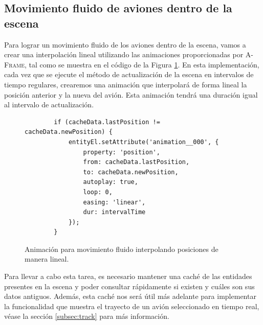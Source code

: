 \documentclass[a4paper, 11pt]{book}
\begin{document}
\subsection{Movimiento fluido de aviones dentro de la escena}
\label{subsec:movimientoFluido}
Para lograr un movimiento fluido de los aviones dentro de la escena, vamos a crear una interpolación lineal utilizando las animaciones proporcionadas por \textsc{A-Frame}, tal como se muestra en el código de la Figura \ref{codigo:movimientoFluido}. En esta implementación, cada vez que se ejecute el método de actualización de la escena en intervalos de tiempo regulares, crearemos una animación que interpolará de forma lineal la posición anterior y la nueva del avión. Esta animación tendrá una duración igual al intervalo de actualización.
\begin{figure}[h]
	\centering
	\begin{verbatim}
		if (cacheData.lastPosition != cacheData.newPosition) {
			entityEl.setAttribute('animation__000', {
				property: 'position',
				from: cacheData.lastPosition,
				to: cacheData.newPosition,
				autoplay: true,
				loop: 0,
				easing: 'linear',
				dur: intervalTime
			});
		}
	\end{verbatim}
	\caption{Animación para movimiento fluido interpolando posiciones de manera lineal.
		\label{codigo:movimientoFluido}}
\end{figure}

Para llevar a cabo esta tarea, es necesario mantener una caché de las entidades presentes en la escena y poder consultar rápidamente si existen y cuáles son sus datos antiguos. Además, esta caché nos será útil más adelante para implementar la funcionalidad que muestra el trayecto de un avión seleccionado en tiempo real, véase la sección \ref{subsec:track} para más información.
\end{document}
